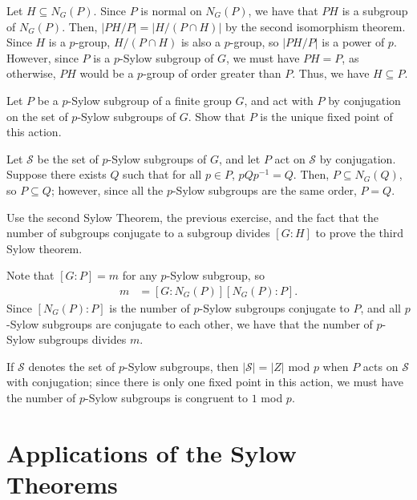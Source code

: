 \documentclass[10pt]{mypackage}
\begin{document}
\begin{solution}
  Let $H\subseteq N_G(P)$. Since $P$ is normal on $N_G(P)$, we have that $PH$ is a subgroup of $N_G(P)$. Then, $\left\vert PH/P \right\vert = \left\vert H/\left( P\cap H \right) \right\vert$ by the second isomorphism theorem. Since $H$ is a $p$-group, $H/\left( P\cap H \right)$ is also a $p$-group, so $\left\vert PH/P \right\vert$ is a power of $p$. However, since $P$ is a $p$-Sylow subgroup of $G$, we must have $PH = P$, as otherwise, $PH$ would be a $p$-group of order greater than $P$. Thus, we have $H\subseteq P$.
\end{solution}
\begin{exercise}
  Let $P$ be a $p$-Sylow subgroup of a finite group $G$, and act with $P$ by conjugation on the set of $p$-Sylow subgroups of $G$. Show that $P$ is the unique fixed point of this action.
\end{exercise}
\begin{solution}
  Let $\mathcal{S}$ be the set of $p$-Sylow subgroups of $G$, and let $P$ act on $\mathcal{S}$ by conjugation. Suppose there exists $Q$ such that for all $p\in P$, $pQp^{-1} = Q$. Then, $P\subseteq N_{G}\left( Q \right)$, so $P\subseteq Q$; however, since all the $p$-Sylow subgroups are the same order, $P = Q$.
\end{solution}
\begin{exercise}
  Use the second Sylow Theorem, the previous exercise, and the fact that the number of subgroups conjugate to a subgroup divides $\left[ G:H \right]$ to prove the third Sylow theorem.
\end{exercise}
\begin{solution}
  Note that $\left[ G:P \right] = m$ for any $p$-Sylow subgroup, so
  \begin{align*}
    m &= \left[ G:N_G(P) \right]\left[ N_G(P):P \right].
  \end{align*}
  Since $\left[ N_G(P):P \right]$ is the number of $p$-Sylow subgroups conjugate to $P$, and all $p$-Sylow subgroups are conjugate to each other, we have that the number of $p$-Sylow subgroups divides $m$.\newline

  If $\mathcal{S}$ denotes the set of $p$-Sylow subgroups, then $\left\vert \mathcal{S} \right\vert = \left\vert Z \right\vert $ mod $p$ when $P$ acts on $\mathcal{S}$ with conjugation; since there is only one fixed point in this action, we must have the number of $p$-Sylow subgroups is congruent to $1$ mod $p$.
\end{solution}
\section{Applications of the Sylow Theorems}%
\end{document}
